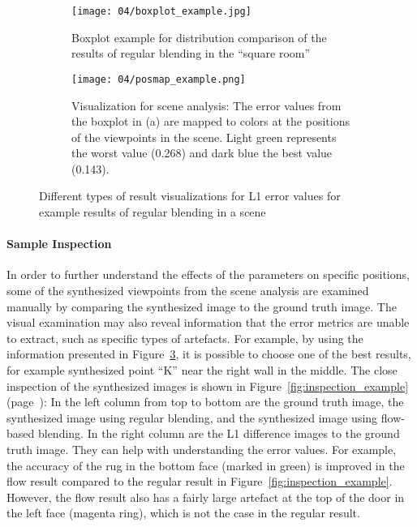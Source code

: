 \begin{figure}
\centering
    \hfill
    \begin{subfigure}[c]{0.5\textwidth}
            \centering
            \texttt{[image: 04/boxplot\_example.jpg]}
            \caption{Boxplot example for distribution comparison of the results of regular blending in the ``square room''} \label{fig:boxplot_example}
    \end{subfigure}%
    \hfill
    \begin{subfigure}[c]{0.5\textwidth}
            \centering
            \texttt{[image: 04/posmap\_example.png]}
            \caption{Visualization for scene analysis: The error values from the boxplot in (a) are mapped to colors at the positions of the viewpoints in the scene. Light green represents the worst value (0.268) and dark blue the best value (0.143).} \label{fig:posmap_example}
    \end{subfigure}
    \hfill
  \caption[Different types of result visualizations for L1 error values]{Different types of result visualizations for L1 error values for example results of regular blending in a scene}
\end{figure}

\paragraph{Sample Inspection}
In order to further understand the effects of the parameters on specific positions, some of the synthesized viewpoints from the scene analysis are examined manually by comparing the synthesized image to the ground truth image. The visual examination may also reveal information that the error metrics are unable to extract, such as specific types of artefacts. For example, by using the information presented in Figure~\ref{fig:posmap_example}, it is possible to choose one of the best results, for example synthesized point ``K'' near the right wall in the middle. The close inspection of the synthesized images is shown in Figure~\ref{fig:inspection_example} (page~\pageref{fig:inspection_example}\footnotemark): In the left column from top to bottom are the ground truth image, the synthesized image using regular blending, and the synthesized image using flow-based blending. In the right column are the L1 difference images to the ground truth image. They can help with understanding the error values. For example, the accuracy of the rug in the bottom face (marked in green) is improved in the flow result compared to the regular result in Figure~\ref{fig:inspection_example}. However, the flow result also has a fairly large artefact at the top of the door in the left face (magenta ring), which is not the case in the regular result.















